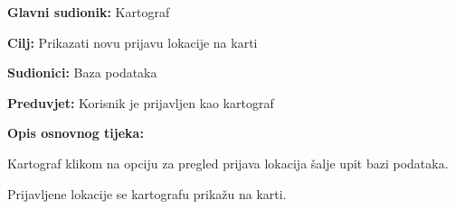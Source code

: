 				\noindent {}
				\begin{packed_item}
					
					\item \textbf{Glavni sudionik: }Kartograf
					\item  \textbf{Cilj:} Prikazati novu prijavu lokacije na karti
					\item  \textbf{Sudionici:} Baza podataka
					\item  \textbf{Preduvjet:} Korisnik je prijavljen kao kartograf
					\item  \textbf{Opis osnovnog tijeka:}
					
					\item[] \begin{packed_enum}
						
						\item Kartograf klikom na opciju za pregled prijava lokacija šalje upit bazi podataka.
						\item Prijavljene lokacije se kartografu prikažu na karti.
					\end{packed_enum}
				\end{packed_item}
				
